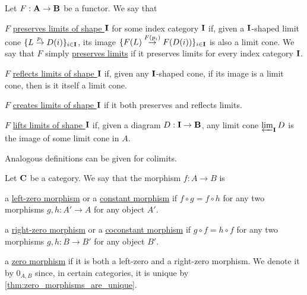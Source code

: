 \begin{definition}\label{def:categorical_limit_preservation}\cite[definitions 5.3.1, 5.3.5]{Leinster2014}
  Let $F: \operatorname{\mathbf{A}} \to \operatorname{\mathbf{B}}$ be a functor. We say that
  \begin{defenum}
    \item\label{def:categorical_limit_preservation/preserve} $F$ \uline{preserves limits of shape $\operatorname{\mathbf{I}}$} for some index category $\operatorname{\mathbf{I}}$ if, given a $\operatorname{\mathbf{I}}$-shaped limit cone \mbox{$\{ L \overset {p_i} \to D(i) \}_{i \in \operatorname{\mathbf{I}}}$}, its image \mbox{$\{ F(L) \overset {F(p_i)} \to F(D(i)) \}_{i \in \operatorname{\mathbf{I}}}$} is also a limit cone. We say that $F$ simply \uline{preserves limits} if it preserves limits for every index category $\operatorname{\mathbf{I}}$.

    \item\label{def:categorical_limit_preservation/reflect} $F$ \uline{reflects limits of shape $\operatorname{\mathbf{I}}$} if, given any $\operatorname{\mathbf{I}}$-shaped cone, if its image is a limit cone, then is it itself a limit cone.

    \item\label{def:categorical_limit_preservation/create} $F$ \uline{creates limits of shape $\operatorname{\mathbf{I}}$} if it both preserves and reflects limits.

    \item\label{def:categorical_limit_preservation/lift} $F$ \uline{lifts limits of shape $\operatorname{\mathbf{I}}$} if, given a diagram $D: \operatorname{\mathbf{I}} \to \operatorname{\mathbf{B}}$, any limit cone $\varprojlim_{\operatorname{\mathbf{I}}} D$ is the image of some limit cone in $A$.
  \end{defenum}
\end{definition}

\begin{note}\label{note:categorical_colimit_preservation}
  Analogous definitions can be given for colimits.
\end{note}

\begin{definition}\label{def:zero_morphism}
  Let $\operatorname{\mathbf{C}}$ be a category. We say that the morphism $f: A \to B$ is
  \begin{defenum}
    \item\label{def:zero_morphism/left} a \uline{left-zero morphism} or a \uline{constant morphism} if $f \circ g = f \circ h$ for any two morphisms $g, h: A' \to A$ for any object $A'$.
    \item\label{def:zero_morphism/right} a \uline{right-zero morphism} or a \uline{coconstant morphism} if $g \circ f = h \circ f$ for any two morphisms $g, h: B \to B'$ for any object $B'$.
    \item\label{def:zero_morphism/bidirectional} a \uline{zero morphism} if it is both a left-zero and a right-zero morphism. We denote it by $0_{A,B}$ since, in certain categories, it is unique by \cref{thm:zero_morphisms_are_unique}.
  \end{defenum}
\end{definition}

